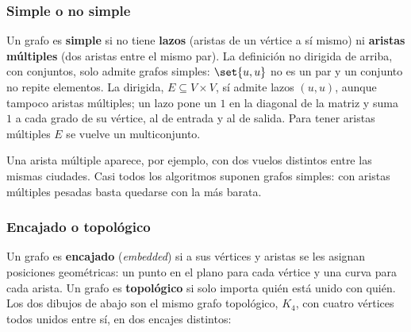 \documentclass[11pt,letterpaper]{article}
\begin{document}
\subsubsection*{Simple o no simple}

Un grafo es \textbf{simple} si no tiene \textbf{lazos} (aristas de un
vértice a sí mismo) ni \textbf{aristas múltiples} (dos aristas entre
el mismo par). La definición no dirigida de arriba, con conjuntos,
solo admite grafos simples: $\set{u, u}$ no es un par y un conjunto no
repite elementos. La dirigida, $E \subseteq V \times V$, sí admite
lazos $(u, u)$, aunque tampoco aristas múltiples; un lazo pone un $1$
en la diagonal de la matriz y suma $1$ a cada grado de su vértice, al
de entrada y al de salida. Para tener aristas múltiples $E$ se vuelve
un multiconjunto.

\begin{center}
\end{center}

Una arista múltiple aparece, por ejemplo, con dos vuelos distintos
entre las mismas ciudades. Casi todos los algoritmos suponen grafos
simples: con aristas múltiples pesadas basta quedarse con la más
barata.

\subsubsection*{Encajado o topológico}

Un grafo es \textbf{encajado} (\textit{embedded}) si a sus vértices y
aristas se les asignan posiciones geométricas: un punto en el plano
para cada vértice y una curva para cada arista. Un grafo es
\textbf{topológico} si solo importa quién está unido con quién. Los
dos dibujos de abajo son el mismo grafo topológico, $K_4$, con cuatro
vértices todos unidos entre sí, en dos encajes distintos:
\end{document}
